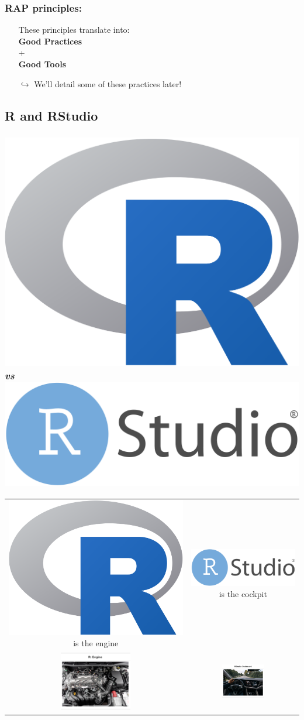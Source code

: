\documentclass[xcolor=x11names,compress, aspectratio=169]{beamer}
\renewcommand{\(}{\begin{columns}}
\renewcommand{\)}{\end{columns}}
\newcommand{\<}[1]{\begin{column}{#1}}
\renewcommand{\>}{\end{column}}
\begin{document}
\begin{frame}[<+->]
   \frametitle{RAP principles:}
   \pause
   \begin{itemize}[<+->]
     \item[] \begin{center}
             These principles translate into: \\ \vspace{0.5cm}
             \textbf{Good Practices }\\ + \\
             \textbf{Good Tools }
    \end{center}
     \item[$\hookrightarrow$] \vspace{2cm} We'll detail some of these practices later!
   \end{itemize}

\end{frame}

\subsection{R and RStudio}

\begin{frame}
\frametitle{ \includegraphics[height=3ex]{R_logo.svg.png}  \textit{vs} 
\includegraphics[height=4ex]{RStudioLogo.png}}
\begin{tabular}{c|c}
   \includegraphics[height=3ex]{R_logo.svg.png} is the engine      &  \includegraphics[height=4ex]{RStudioLogo.png} is the cockpit  \\
   \includegraphics[width=0.4\textwidth]{REngine.png}  &     \includegraphics[width=0.4\textwidth]{RStudioAsCarDashboard.png} \\
\end{tabular}
\end{frame}
\end{document}
